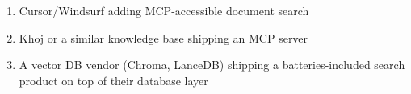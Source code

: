 \documentclass[11pt,letterpaper]{article}
\begin{document}
\begin{enumerate}[nosep, leftmargin=2em]
  \item Cursor/Windsurf adding MCP-accessible document search
  \item Khoj or a similar knowledge base shipping an MCP server
  \item A vector DB vendor (Chroma, LanceDB) shipping a batteries-included
        search product on top of their database layer
\end{enumerate}


\newpage
\printbibliography[title={References}]
\end{document}
